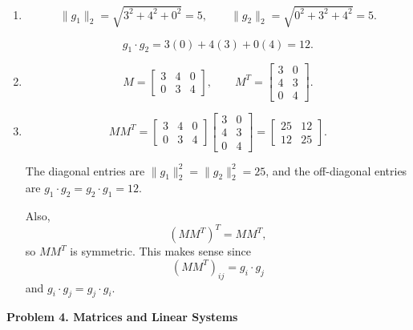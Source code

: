 \documentclass[12pt]{article}
\begin{document}
\begin{enumerate}
    \item[(a)]
    \[
    \|g_1\|_2=\sqrt{3^2+4^2+0^2}=5,
    \qquad
    \|g_2\|_2=\sqrt{0^2+3^2+4^2}=5.
    \]
    
    \[
    g_1\cdot g_2
    =3(0)+4(3)+0(4)
    =12.
    \]
    
    \item[(b)]
    \[
    M=
    \begin{bmatrix}
    3 & 4 & 0\\
    0 & 3 & 4
    \end{bmatrix},
    \qquad
    M^T=
    \begin{bmatrix}
    3 & 0\\
    4 & 3\\
    0 & 4
    \end{bmatrix}.
    \]
    
    \item[(c)]
    \[
    MM^T=
    \begin{bmatrix}
    3 & 4 & 0\\
    0 & 3 & 4
    \end{bmatrix}
    \begin{bmatrix}
    3 & 0\\
    4 & 3\\
    0 & 4
    \end{bmatrix}
    =
    \begin{bmatrix}
    25 & 12\\
    12 & 25
    \end{bmatrix}.
    \]
    
    The diagonal entries are
    $\|g_1\|_2^2=\|g_2\|_2^2=25$,
    and the off-diagonal entries are
    $g_1\cdot g_2=g_2\cdot g_1=12$.
    
    Also,
    \[
    (MM^T)^T=MM^T,
    \]
    so $MM^T$ is symmetric. This makes sense since
    \[
    (MM^T)_{ij}=g_i\cdot g_j
    \]
    and $g_i\cdot g_j=g_j\cdot g_i$.
\end{enumerate}





\textbf{Problem 4. Matrices and Linear Systems}
\end{document}
